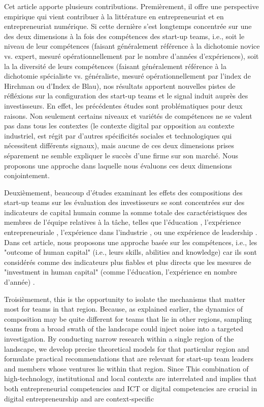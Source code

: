 \documentclass[12pt]{article}
\begin{document}
Cet article apporte plusieurs contributions. Premièrement, il offre une perspective empirique qui vient contribuer à la littérature en entrepreneuriat et en entrepreneuriat numérique. Si cette dernière s'est longtemps concentrée sur une des deux dimensions à la fois des compétences des start-up teams, i.e., soit le niveau de leur compétences (faisant généralement référence à la dichotomie novice vs. expert, mesuré opérationnellement par le nombre d'années d'expériences), soit la la diversité de leurs compétences (faisant généralement référence à la dichotomie spécialiste vs. généraliste, mesuré opérationnellement par l'index de Hirchman ou d'Index de Blau), nos résultats apportent nouvelles pistes de réfléxions sur la configuration des start-up teams et le signal induit auprès des investisseurs. En effet, les précédentes études sont problématiques pour deux raisons. Non seulement certains niveaux et variétés de compétences ne se valent pas dans tous les contextes (le contexte digital par opposition au contexte industriel, est régit par d'autres spécificités sociales et technologiques qui nécessitent différents signaux), mais aucune de ces deux dimensions prises séparement ne semble expliquer le succès d'une firme sur son marché. Nous proposons une approche dans laquelle nous évaluons ces deux dimensions conjointement.

Deuxièmement, beaucoup d'études examinant les effets des compositions des start-up teams sur les évaluation des investisseurs se sont concentrées sur des indicateurs de capital humain comme la somme totale des caractéristiques des membres de l'équipe relatives à la tâche, telles que l'éducation \citep{franke2008venture}, l'expérience entrepreneuriale \citep{beckman2007early}, l'expérience dans l'industrie \citep{becker2015new}, ou une expérience de leadership \citep{hoenig2015quality}. Dans cet article, nous proposons une approche basée sur les compétences, i.e., les "outcome of human capital" (i.e., leurs skills, abilities and knowledge) car ils sont considérés comme des indicateurs plus fiables et plus directs que les mesures de "investment in human capital" (comme l'éducation, l'expérience en nombre d'année) \citep{unger2011human, marvel2016human}.

Troisièmement, this is the opportunity to isolate the mechanisms that matter most for teams in that region. Because, as explained earlier, the dynamics of composition may be quite different for teams that lie in other regions, sampling teams from a broad swath of the landscape could inject noise into a targeted investigation. By conducting narrow research within a single region of the landscape, we develop precise theoretical models for that particular region and formulate practical recommendations that are relevant for start-up team leaders and members whose ventures lie within that region. Since \citep{ngoasong2017digital} This combination of high-technology, institutional and local contexts are interrelated and implies that both entrepreneurial competencies and ICT or digital competencies are crucial in digital entrepreneurship and are context-specific

\clearpage



\end{document}
